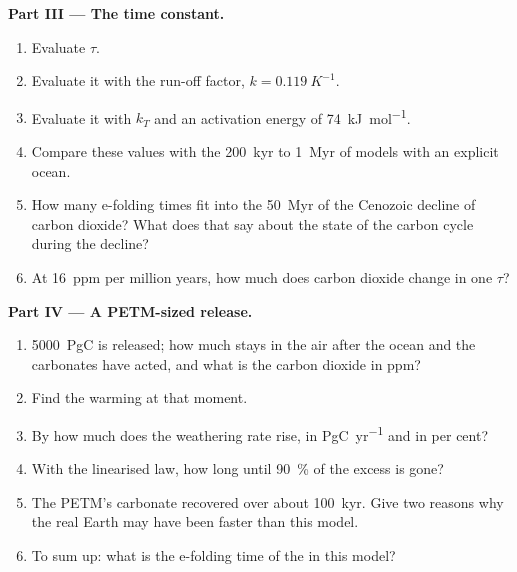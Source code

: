\begin{problem}
\noindent\textbf{Part III --- The time constant.}
\begin{enumerate}[resume]
  \item Evaluate $\tau$.
  \item Evaluate it with the run-off factor, $k = \qty{0.119}{K^{-1}}$.
  \item Evaluate it with $k_T$ and an activation energy of \qty{74}{kJ.mol^{-1}}.
  \item Compare these values with the \qty{200}{kyr} to \qty{1}{Myr} of models with an explicit ocean.
  \item How many e-folding times fit into the \qty{50}{Myr} of the Cenozoic decline of carbon
        dioxide? What does that say about the state of the carbon cycle during the decline?
  \item At \qty{16}{ppm} per million years, how much does carbon dioxide change in one $\tau$?
\end{enumerate}

\noindent\textbf{Part IV --- A PETM-sized release.}
\begin{enumerate}[resume]
  \item \qty{5000}{PgC} is released; how much stays in the air after the ocean and the carbonates
        have acted, and what is the carbon dioxide in ppm?
  \item Find the warming at that moment.
  \item By how much does the weathering rate rise, in \unit{PgC.yr^{-1}} and in per cent?
  \item With the linearised law, how long until \qty{90}{\percent} of the excess is gone?
  \item The PETM's carbonate recovered over about \qty{100}{kyr}. Give two reasons why the real
        Earth may have been faster than this model.
  \item To sum up: what is the e-folding time of the  in this model?
\end{enumerate}
\end{problem}
